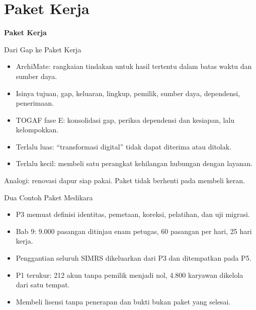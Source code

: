 \documentclass[aspectratio=169, table, 12pt]{beamer}
\begin{document}
\section{Paket Kerja}

\begin{frame}{\hfill}
  \centering
  \Huge{\textbf{Paket Kerja}}
\end{frame}

\begin{frame}{{\Large Dari Gap ke Paket Kerja}}
  \vspace{10pt}
  \begin{itemize}
    \item ArchiMate: rangkaian tindakan untuk hasil tertentu dalam batas waktu dan sumber daya.
    \item Isinya tujuan, gap, keluaran, lingkup, pemilik, sumber daya, dependensi, penerimaan.
    \item TOGAF fase E: konsolidasi gap, periksa dependensi dan kesiapan, lalu kelompokkan.
    \item Terlalu luas: ``transformasi digital'' tidak dapat diterima atau ditolak.
    \item Terlalu kecil: membeli satu perangkat kehilangan hubungan dengan layanan.
  \end{itemize}
  \vspace{6pt}
  {\small Analogi: renovasi dapur siap pakai. Paket tidak berhenti pada membeli keran.}
\end{frame}

\begin{frame}{{\Large Dua Contoh Paket Medikara}}
  \vspace{10pt}
  \begin{itemize}
    \item P3 memuat definisi identitas, pemetaan, koreksi, pelatihan, dan uji migrasi.
    \item Bab 9: 9.000 pasangan ditinjau enam petugas, 60 pasangan per hari, 25 hari kerja.
    \item Penggantian seluruh SIMRS dikeluarkan dari P3 dan ditempatkan pada P5.
    \item P1 terukur: 212 akun tanpa pemilik menjadi nol, 4.800 karyawan dikelola dari satu tempat.
    \item Membeli lisensi tanpa penerapan dan bukti bukan paket yang selesai.
  \end{itemize}
\end{frame}
\end{document}
